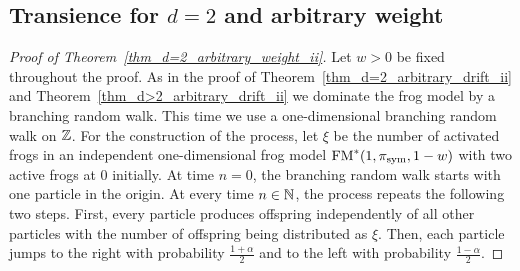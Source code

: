 
\subsection*{Transience for $d=2$ and arbitrary weight}

\begin{proof}[Proof of Theorem~\ref{thm_d=2_arbitrary_weight_ii}]
Let $w >0$ be fixed throughout the proof. As in the proof of Theorem~\ref{thm_d=2_arbitrary_drift_ii} and Theorem~\ref{thm_d>2_arbitrary_drift_ii} we dominate the frog model by a branching random walk. This time we use a one-dimensional branching random walk on $\mathbb{Z}$. For the construction of the process, let $\xi$ be the number of activated frogs in an independent one-dimensional frog model $\operatorname{FM}^*(1,\pi_{\text{sym}}, 1-w)$ with two active frogs at $0$ initially. At time $n=0$, the branching random walk starts with one particle in the origin. At every time $n \in \mathbb{N}$, the process repeats the following two steps. First, every particle produces offspring independently of all other particles with the number of offspring being distributed as $\xi$. Then, each particle jumps to the right with probability $\frac{1+\alpha}{2}$ and to the left with probability $\frac{1-\alpha}{2}$. 


\end{proof}
